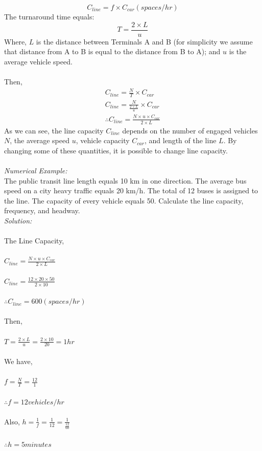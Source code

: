\begin{equation}
	C_{line} = f \times C_{car} (spaces/hr)
\end{equation}
The turnaround time equals:
\begin{equation}
	T = \frac{2 \times L}{u}
\end{equation}
Where, $L$ is the distance between Terminals A and B (for simplicity we assume that distance from A to B is equal to the distance from B to A); and $u$ is the average vehicle speed.\\\\
Then,
\begin{gather}
	C_{line} = \frac{N}{T} \times C_{car}\\
	C_{line} = \frac{N}{\frac{2 \times L}{u}} \times C_{car}\\
	\therefore C_{line} = \frac{N \times u \times C_{car}}{2 \times L}
\end{gather}
As we can see, the line capacity $ C_{line} $ depends on the number of engaged vehicles $ N $, the average speed $u$, vehicle capacity $C_{car}$, and length of the line $L$. By changing some of these quantities, it is possible to change line capacity.\\\\
\textit{Numerical Example:}\\
The public transit line length equals 10 km in one direction. The average bus speed on a city heavy traffic equals 20 km/h. The total of 12 buses is assigned to the line. The capacity of every vehicle equals 50. Calculate the line capacity, frequency, and headway.\\
\textit{Solution:}\\\\
The Line Capacity,\\\\
$ C_{line} = \frac{N \times u \times C_{car}}{2 \times L}$\\\\
$ C_{line} = \frac{12 \times 20 \times 50}{2 \times 10}$\\\\
$ \therefore C_{line} = 600 (spaces/hr)$\\\\
Then,\\\\
$ T = \frac{2 \times L}{u} = \frac{2 \times 10}{20} = 1 hr$\\\\
We have,\\\\
$ f = \frac{N}{T} = \frac{12}{1}$\\\\
$ \therefore f = 12 vehicles/hr$\\\\
Also,
$ h = \frac{1}{f} = \frac{1}{12} = \frac{1}{\frac{12}{60}}$\\\\
$ \therefore h = 5 minutes$
%
